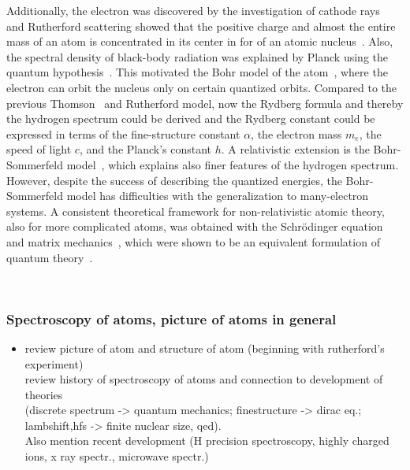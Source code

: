 Additionally, the electron was discovered by the investigation of cathode rays~\cite{thomson1897,rechenberg1997} and Rutherford scattering showed that the positive charge and almost the entire mass of an atom is concentrated in its center in for of an atomic nucleus~\cite{rutherford1911}. Also, the spectral density of black-body radiation was explained by Planck using the quantum hypothesis~\cite{planck1978}. This motivated the Bohr model of the atom~\cite{bohr1913}, where the electron can orbit the nucleus only on certain quantized orbits. Compared to the previous Thomson~\cite{thomson1904} and Rutherford model, now the Rydberg formula and thereby the hydrogen spectrum could be derived and the Rydberg constant could be expressed in terms of the fine-structure constant $\alpha$, the electron mass $m_e$, the speed of light $c$, and the Planck's constant $h$. A relativistic extension is the Bohr-Sommerfeld model~\cite{sommerfeld1916}, which explains also finer features of the hydrogen spectrum.
However, despite the success of describing the quantized energies, the Bohr-Sommerfeld model has difficulties with the generalization to many-electron systems. A consistent theoretical framework for non-relativistic atomic theory, also for more complicated atoms, was obtained with the Schrödinger equation~\cite{schrodinger1926_1,schrodinger1926_2,schrodinger1926_3,schrodinger1926_4} and matrix mechanics~\cite{heisenberg1925,born1925,born1926}, which were shown to be an equivalent formulation of quantum theory~\cite{schrodinger1926_5}.




















~\cite{haensch1979}
















\clearpage
\subsubsection*{Spectroscopy of atoms, picture of atoms in general}
\begin{itemize}
\item
review picture of atom and structure of atom (beginning with rutherford's experiment)\\
review history of spectroscopy of atoms and connection to development of theories\\
(discrete spectrum -> quantum mechanics; finestructure -> dirac eq.; lambshift,hfs -> finite nuclear size, qed). \\
Also mention recent development (H precision spectroscopy, highly charged ions, x ray spectr., microwave spectr.)\\
\end{itemize}

